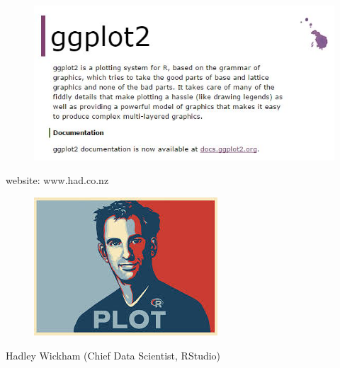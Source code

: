 \documentclass{beamer}
\begin{document}
	
\begin{frame}
	\begin{figure}
\centering
\includegraphics[width=1.1\linewidth]{ggplot2-website}
\end{figure}
website: www.had.co.nz

\end{frame}
\begin{frame}
	\begin{figure}
\centering
\includegraphics[width=0.95\linewidth]{HW}

\end{figure}
Hadley Wickham (Chief Data Scientist, RStudio)
\end{frame}
\end{document}
